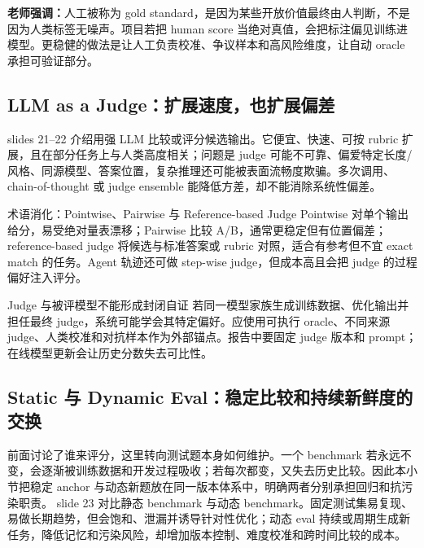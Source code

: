 \textbf{老师强调：}人工被称为 gold standard，是因为某些开放价值最终由人判断，不是因为人类标签无噪声。项目若把 human score 当绝对真值，会把标注偏见训练进模型。更稳健的做法是让人工负责校准、争议样本和高风险维度，让自动 oracle 承担可验证部分。

\subsection{LLM as a Judge：扩展速度，也扩展偏差}

slides 21--22 介绍用强 LLM 比较或评分候选输出。它便宜、快速、可按 rubric 扩展，且在部分任务上与人类高度相关；问题是 judge 可能不可靠、偏爱特定长度/风格、同源模型、答案位置，复杂推理还可能被表面流畅度欺骗。多次调用、chain-of-thought 或 judge ensemble 能降低方差，却不能消除系统性偏差。


\begin{knowledgebox}{术语消化：Pointwise、Pairwise 与 Reference-based Judge}
Pointwise 对单个输出给分，易受绝对量表漂移；Pairwise 比较 A/B，通常更稳定但有位置偏差；reference-based judge 将候选与标准答案或 rubric 对照，适合有参考但不宜 exact match 的任务。Agent 轨迹还可做 step-wise judge，但成本高且会把 judge 的过程偏好注入评分。
\end{knowledgebox}

\begin{warningbox}{Judge 与被评模型不能形成封闭自证}
若同一模型家族生成训练数据、优化输出并担任最终 judge，系统可能学会其特定偏好。应使用可执行 oracle、不同来源 judge、人类校准和对抗样本作为外部锚点。报告中要固定 judge 版本和 prompt；在线模型更新会让历史分数失去可比性。
\end{warningbox}

\subsection{Static 与 Dynamic Eval：稳定比较和持续新鲜度的交换}

前面讨论了谁来评分，这里转向测试题本身如何维护。一个 benchmark 若永远不变，会逐渐被训练数据和开发过程吸收；若每次都变，又失去历史比较。因此本小节把稳定 anchor 与动态新题放在同一版本体系中，明确两者分别承担回归和抗污染职责。
slide 23 对比静态 benchmark 与动态 benchmark。固定测试集易复现、易做长期趋势，但会饱和、泄漏并诱导针对性优化；动态 eval 持续或周期生成新任务，降低记忆和污染风险，却增加版本控制、难度校准和跨时间比较的成本。


